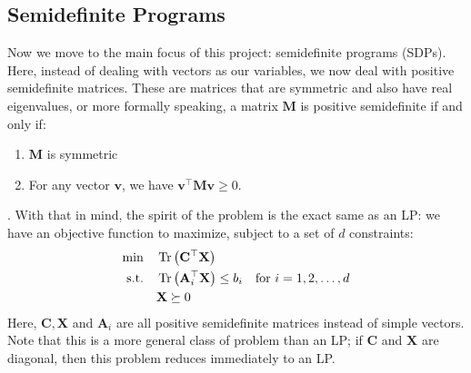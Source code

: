 \documentclass[11pt]{article}
\begin{document}
	\subsection{Semidefinite Programs}
    \label{SDP}
	Now we move to the main focus of this project: semidefinite programs (SDPs). Here, instead of dealing with 
	vectors as our variables, we now deal with positive semidefinite matrices. 
	These are matrices that are symmetric and also have real eigenvalues, or more formally 
	speaking, a matrix \( \mathbf M \) is positive semidefinite if and only if:
	\begin{enumerate}[label=\arabic*.]
		\item \( \mathbf M \) is symmetric
		\item For any vector \( \mathbf v \), we have \( \mathbf v^{\top}\mathbf M \mathbf v \ge 0 \). 
	\end{enumerate}
	\cite{mittalLecturePositiveSemidefinite}. With that in mind, the spirit of the problem is the exact same as an LP: we have an objective function to 
	maximize, subject to a set of \( d \) constraints: 
	\begin{align*}
		\min \quad &\Tr \left(\mathbf C^{\top}\mathbf X\right)\\
		\text{s.t.}\quad & \Tr \left(\mathbf A_i^{\top}\mathbf X\right) \le  b_i \quad \text{for \( i = 1, 2, \dots, d \)}\\
						 & \mathbf X \succeq 0
	\end{align*}
	Here, \( \mathbf{C}, \mathbf X \) and \( \mathbf A_i \) are all positive semidefinite matrices instead of simple 
	vectors. Note that this is a more general class of problem than an LP; if \( \mathbf C \) and \( \mathbf X \) are 
	diagonal, then this problem reduces immediately to an LP. 
\end{document}
